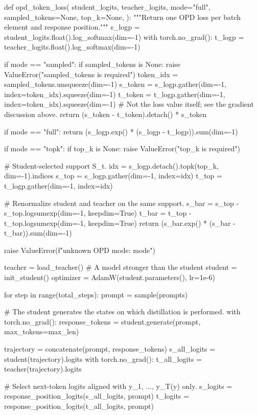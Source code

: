 \begin{codeblock}[language=Python]
def opd_token_loss(
    student_logits,
    teacher_logits,
    mode="full",
    sampled_tokens=None,
    top_k=None,
):
    """Return one OPD loss per batch element and response position."""
    s_logp = student_logits.float().log_softmax(dim=-1)
    with torch.no_grad():
        t_logp = teacher_logits.float().log_softmax(dim=-1)

    if mode == "sampled":
        if sampled_tokens is None:
            raise ValueError("sampled_tokens is required")
        token_idx = sampled_tokens.unsqueeze(dim=-1)
        s_token = s_logp.gather(dim=-1, index=token_idx).squeeze(dim=-1)
        t_token = t_logp.gather(dim=-1, index=token_idx).squeeze(dim=-1)
        # Not the loss value itself; see the gradient discussion above.
        return (s_token - t_token).detach() * s_token

    if mode == "full":
        return (s_logp.exp() * (s_logp - t_logp)).sum(dim=-1)

    if mode == "topk":
        if top_k is None:
            raise ValueError("top_k is required")

        # Student-selected support S_t.
        idx = s_logp.detach().topk(top_k, dim=-1).indices
        s_top = s_logp.gather(dim=-1, index=idx)
        t_top = t_logp.gather(dim=-1, index=idx)

        # Renormalize student and teacher on the same support.
        s_bar = s_top - s_top.logsumexp(dim=-1, keepdim=True)
        t_bar = t_top - t_top.logsumexp(dim=-1, keepdim=True)
        return (s_bar.exp() * (s_bar - t_bar)).sum(dim=-1)

    raise ValueError(f"unknown OPD mode: {mode}")


teacher = load_teacher()  # A model stronger than the student
student = init_student()
optimizer = AdamW(student.parameters(), lr=1e-6)

for step in range(total_steps):
    prompt = sample(prompts)

    # The student generates the states on which distillation is performed.
    with torch.no_grad():
        response_tokens = student.generate(prompt, max_tokens=max_len)

    trajectory = concatenate(prompt, response_tokens)
    s_all_logits = student(trajectory).logits
    with torch.no_grad():
        t_all_logits = teacher(trajectory).logits

    # Select next-token logits aligned with y_1, ..., y_{T(y)} only.
    s_logits = response_position_logits(s_all_logits, prompt)
    t_logits = response_position_logits(t_all_logits, prompt)


\end{codeblock}
